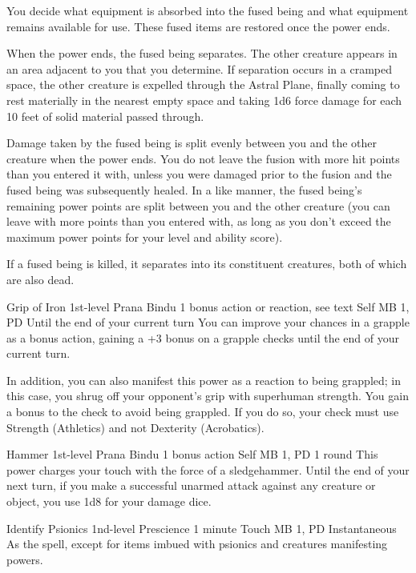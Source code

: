   You decide what equipment is absorbed into the fused being
  and what equipment remains available for use.
  These fused items are restored once the power ends.
  
  When the power ends,
  the fused being separates.
  The other creature appears in an area adjacent to you that you determine.
  If separation occurs in a cramped space,
  the other creature is expelled through the Astral Plane,
  finally coming to rest materially in the nearest empty space
  and taking 1d6 force damage
  for each 10 feet of solid material passed through.
  
  Damage taken by the fused being is split evenly
  between you and the other creature when the power ends.
  You do not leave the fusion with more hit points
  than you entered it with,
  unless you were damaged prior to the fusion
  and the fused being was subsequently healed.
  In a like manner,
  the fused being's remaining power points are split
  between you and the other creature
  (you can leave with more points than you entered with,
  as long as you don't exceed the maximum power points
  for your level and ability score).
  
  If a fused being is killed,
  it separates into its constituent creatures,
  both of which are also dead.

\DndPowerHeader%
  {Grip of Iron}
  {1st-level Prana Bindu}
  {1 bonus action or reaction, see text}
  {Self}
  {MB 1, PD \lvlone}
  {Until the end of your current turn}
  You can improve your chances in a grapple as a bonus action,
  gaining a +3 bonus on a grapple checks until
  the end of your current turn.

  In addition, you can also manifest this power
  as a reaction to being grappled; in this case, you shrug
  off your opponent's grip with superhuman strength.
  You gain a bonus to the check to avoid being grappled.
  If you do so,
  your check must use Strength (Athletics) and not
  Dexterity (Acrobatics).

\DndPowerHeader%
  {Hammer}
  {1st-level Prana Bindu}
  {1 bonus action}
  {Self}
  {MB 1, PD \lvlone}
  {1 round}
This power charges your touch with the force of a sledgehammer.
Until the end of your next turn,
if you make a successful unarmed attack against any creature or object,
you use 1d8 for your damage dice.

\DndPowerHeader%
  {Identify Psionics}
  {1nd-level Prescience}
  {1 minute}
  {Touch}
  {MB 1, PD \lvlone}
  {Instantaneous}
As the  spell,
except for items imbued with psionics
and creatures manifesting powers.

